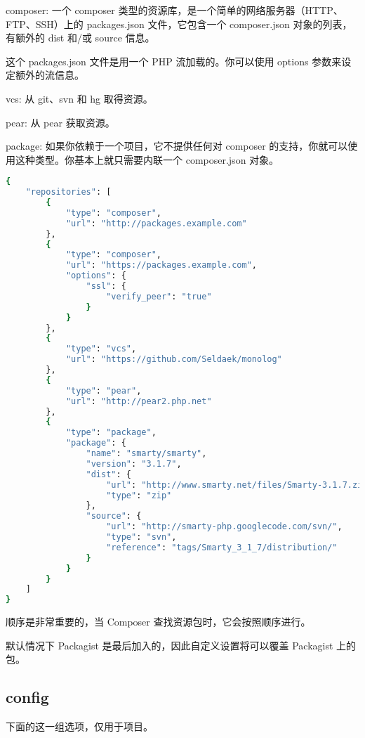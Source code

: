\begin{compactitem}
\item composer: 一个 composer 类型的资源库，是一个简单的网络服务器（HTTP、FTP、SSH）上的 packages.json 文件，它包含一个 composer.json 对象的列表，有额外的 dist 和/或 source 信息。

这个 packages.json 文件是用一个 PHP 流加载的。你可以使用 options 参数来设定额外的流信息。
\item vcs: 从 git、svn 和 hg 取得资源。
\item pear: 从 pear 获取资源。
\item package: 如果你依赖于一个项目，它不提供任何对 composer 的支持，你就可以使用这种类型。你基本上就只需要内联一个 composer.json 对象。
\end{compactitem}

\begin{lstlisting}[language=bash]
{
    "repositories": [
        {
            "type": "composer",
            "url": "http://packages.example.com"
        },
        {
            "type": "composer",
            "url": "https://packages.example.com",
            "options": {
                "ssl": {
                    "verify_peer": "true"
                }
            }
        },
        {
            "type": "vcs",
            "url": "https://github.com/Seldaek/monolog"
        },
        {
            "type": "pear",
            "url": "http://pear2.php.net"
        },
        {
            "type": "package",
            "package": {
                "name": "smarty/smarty",
                "version": "3.1.7",
                "dist": {
                    "url": "http://www.smarty.net/files/Smarty-3.1.7.zip",
                    "type": "zip"
                },
                "source": {
                    "url": "http://smarty-php.googlecode.com/svn/",
                    "type": "svn",
                    "reference": "tags/Smarty_3_1_7/distribution/"
                }
            }
        }
    ]
}
\end{lstlisting}

顺序是非常重要的，当 Composer 查找资源包时，它会按照顺序进行。

默认情况下 Packagist 是最后加入的，因此自定义设置将可以覆盖 Packagist 上的包。

\subsection{config}


下面的这一组选项，仅用于项目。

